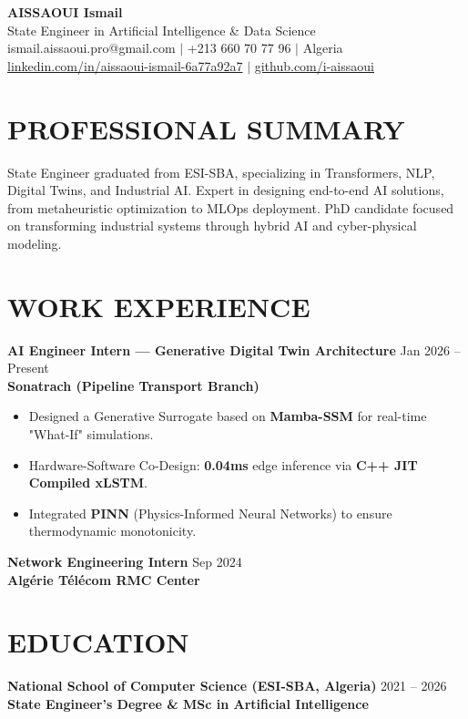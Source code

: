\documentclass[a4paper,11pt]{article}
\begin{document}
\begin{center}
    {\Huge\bfseries\color{titleblue} AISSAOUI Ismail}\\[4pt]
    {\Large State Engineer in Artificial Intelligence \& Data Science}\\[6pt]
    ismail.aissaoui.pro@gmail.com $|$ +213 660 70 77 96 $|$ Algeria \\
    \href{https://linkedin.com/in/aissaoui-ismail-6a77a92a7}{linkedin.com/in/aissaoui-ismail-6a77a92a7} $|$ \href{https://github.com/i-aissaoui}{github.com/i-aissaoui}
\end{center}

\section{PROFESSIONAL SUMMARY}
State Engineer graduated from ESI-SBA, specializing in Transformers, NLP, Digital Twins, and Industrial AI. Expert in designing end-to-end AI solutions, from metaheuristic optimization to MLOps deployment. PhD candidate focused on transforming industrial systems through hybrid AI and cyber-physical modeling.

\section{WORK EXPERIENCE}
\textbf{AI Engineer Intern — Generative Digital Twin Architecture} \hfill Jan 2026 -- Present \\
\textbf{Sonatrach (Pipeline Transport Branch)} \\
\begin{itemize}
    \item Designed a Generative Surrogate based on \textbf{Mamba-SSM} for real-time "What-If" simulations.
    \item Hardware-Software Co-Design: \textbf{0.04ms} edge inference via \textbf{C++ JIT Compiled xLSTM}.
    \item Integrated \textbf{PINN} (Physics-Informed Neural Networks) to ensure thermodynamic monotonicity.
\end{itemize}

\textbf{Network Engineering Intern} \hfill Sep 2024 \\
\textbf{Algérie Télécom RMC Center}

\section{EDUCATION}
\textbf{National School of Computer Science (ESI-SBA, Algeria)} \hfill 2021 -- 2026 \\
\textbf{State Engineer's Degree \& MSc in Artificial Intelligence}
\end{document}

